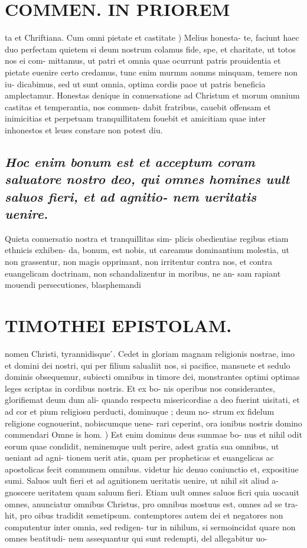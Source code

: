 \documentclass{article}
\begin{document}
\begin{pages}
\section*{COMMEN. IN PRIOREM }
\marginpar{[ p.46 ]}\pstart ta et Chriftiana.  \pend\pstart Cum omni pietate et castitate ) Melius honesta- te, faciunt haec duo perfectam quietem si deum nostrum colamus fide, spe, et charitate, ut totos nos ei com- mittamus, ut patri et omnia quae ocurrunt patris prouidentia et pietate euenire certo credamus, tunc enim murmm aomms minquam, temere non iu- dicabimus, sed ut sunt omnia, optima cordis paoe ut patris beneficia amplectamur.  \pend\pstart Honestas denique in conuersatione ad Christum et morum omnium castitas et temperantia, nos commen- dabit fratribus, cauebit offensam et inimicitias et perpetuam tranquillitatem fouebit et amicitiam quae inter inhonestos et leues constare non potest diu.  \pend
{}
{}
\subsection*{\textit{Hoc enim bonum est et acceptum coram saluatore nostro deo, qui omnes homines uult saluos fieri, et ad agnitio- nem ueritatis uenire. }}\pstart Quieta conuersatio nostra et tranquillitas sim- plicis obedientiae regibus etiam ethnicis exhiben- da, bonum, est nobis, ut careamus dominantium molestia, ut non grassentur, non magis opprimant, non irritentur contra nos, et contra euangelicam doctrinam, non schandalizentur in moribus, ne an- sam rapiant mouendi persecutiones, blasphemandi  \pend
\section*{TIMOTHEI EPISTOLAM. }
\marginpar{[ p.47 ]}\pstart nomen Christi, tyrannidisque ́.  \pend\pstart Cedet in gloriam magnam religionis nostrae, imo et domini dei nostri, qui per filium salualiit nos, si pacifice, mansuete et sedulo dominis obsequemur, subiecti omnibus in timore dei, monstrantes optimi optimas leges scriptas in cordibus nostris. Et ex bo- nis operibus nos considerantes, glorifiemat deum dum ali- quando respectu misericordiae a deo fuerint uisitati, et ad cor et pium religiosu perducti, dominuque ; deum no- strum ex fidelum religione cognouerint, nobiscumque uene- rari ceperint, ora ionibus nostris domino commendari  \pend\pstart Omne is hom. ) Est enim dominus deus summae bo- nus et nihil odit eorum quae condidit, neminemque uult perire, adest gratia sua omnibus, ut ueniant ad agni- tionem uerit atis, quam per propheticas et euangelicas ac apostolicas fecit communem omnibus. videtur hic denuo coniunctio et, expositiue sumi. Saluos uult fieri et ad agnitionem ueritatis uenire, ut nihil sit aliud a- gnoscere ueritatem quam saluum fieri. Etiam uult omnes saluos ficri quia uocauit omnes, anunciatur omnibus Christus, pro omnibus mostuus est, omnes ad se tra- hit, pro oibus tradidit semetipsum. contemptores autem dei et negatores non computentur inter omnia, sed redigen- tur in nihilum, si sermoincidat quare non omnes beatitudi- nem assequantur qui sunt redempti, del allegabitur uo-  \pend

\end{pages}
\end{document}
